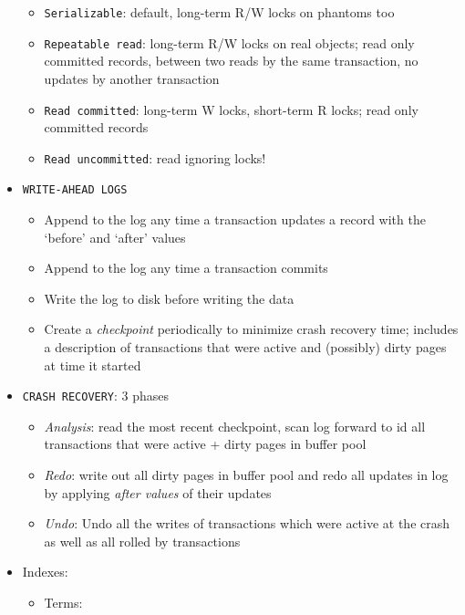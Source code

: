 \documentclass[landscape,8pt]{extarticle}
\newcommand{\code}{\lstinline}
\begin{document}
\begin{multicols}{5}
\begin{itemize}
              \begin{itemize}
                  \item \code{Serializable}: default, long-term R/W locks on phantoms too
                  \item \code{Repeatable read}: long-term R/W locks on real objects; read only committed records, between two reads by the same transaction, no updates by another transaction
                  \item \code{Read committed}: long-term W locks, short-term R locks; read only committed records
                  \item \code{Read uncommitted}: read ignoring locks!
              \end{itemize}
        \item \code{WRITE-AHEAD LOGS}
              \begin{itemize}
                  \item Append to the log any time a transaction updates a record with the `before' and `after' values
                  \item Append to the log any time a transaction commits
                  \item Write the log to disk before writing the data
                  \item Create a \emph{checkpoint} periodically to minimize crash recovery time; includes a description of transactions that were active and (possibly) dirty pages at time it started
              \end{itemize}
        \item \code{CRASH RECOVERY}: 3 phases
              \begin{itemize}
                  \item \emph{Analysis}: read the most recent checkpoint, scan log forward to id all transactions that were active + dirty pages in buffer pool
                  \item \emph{Redo}: write out all dirty pages in buffer pool and redo all updates in log by applying \emph{after values} of their updates
                  \item \emph{Undo}: Undo all the writes of transactions which were active at the crash as well as all rolled by transactions
              \end{itemize}
        \item Indexes:
              \begin{itemize}
                  \item Terms:

\end{itemize}
\end{itemize}
\end{multicols}
\end{document}
